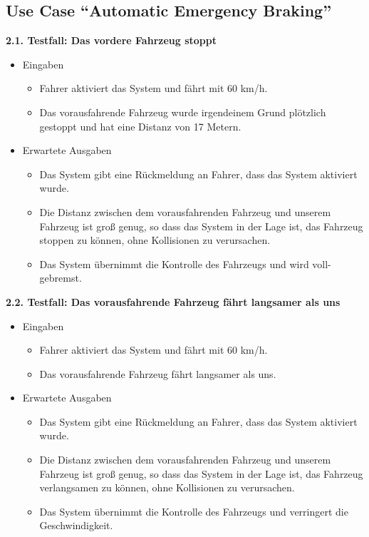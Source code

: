 \subsection{Use Case \enquote{Automatic Emergency Braking}}
\textbf{2.1. Testfall: Das vordere Fahrzeug stoppt}
\begin{itemize}
	\item Eingaben
	\begin{itemize}
		\item Fahrer aktiviert das System und fährt mit 60 km/h.
		\item Das vorausfahrende Fahrzeug wurde irgendeinem Grund plötzlich gestoppt und hat eine Distanz von 17 Metern.
	\end{itemize}
	\item Erwartete Ausgaben
	\begin{itemize}
		\item Das System gibt eine Rückmeldung an Fahrer, dass das System aktiviert wurde.
		\item Die Distanz zwischen dem vorausfahrenden Fahrzeug und unserem Fahrzeug ist groß genug, so dass das System in der Lage ist, das Fahrzeug stoppen zu können, ohne Kollisionen zu verursachen.
		\item Das System übernimmt die Kontrolle des Fahrzeugs und wird voll-gebremst.
	\end{itemize}
\end{itemize}
\textbf{2.2. Testfall: Das vorausfahrende Fahrzeug fährt langsamer als uns}
\begin{itemize}
	\item Eingaben
	\begin{itemize}
		\item Fahrer aktiviert das System und fährt mit 60 km/h.
		\item Das vorausfahrende Fahrzeug fährt langsamer als uns.
	\end{itemize}
	\item Erwartete Ausgaben
		\begin{itemize}
		\item Das System gibt eine Rückmeldung an Fahrer, dass das System aktiviert wurde.
		\item Die Distanz zwischen dem vorausfahrenden Fahrzeug und unserem Fahrzeug ist groß genug, so dass das System in der Lage ist, das Fahrzeug verlangsamen zu können, ohne Kollisionen zu verursachen.
		\item Das System übernimmt die Kontrolle des Fahrzeugs und verringert die Geschwindigkeit.
	\end{itemize}
\end{itemize}
